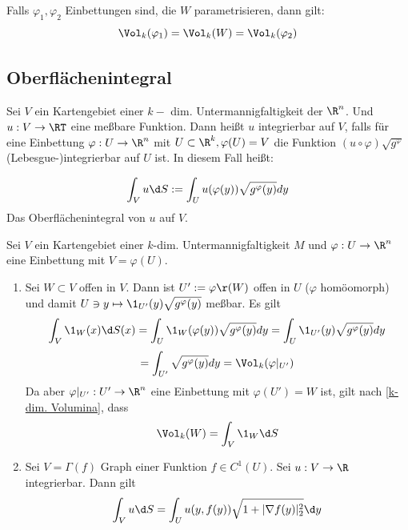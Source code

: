 \documentclass[11pt, a4paper]{article}
\begin{document}
\begin{note} Falls $\varphi_1, \varphi_2$ Einbettungen sind, die $W$ parametrisieren, dann gilt:
$$\Vol_k(\varphi_1) = \Vol_k(W) = \Vol_k(\varphi_2)$$
\end{note}

\vspace{0.3cm} \par \subsection{Oberflächenintegral}
\begin{definition} Sei $V$ ein Kartengebiet einer $k-$ dim. Untermannigfaltigkeit der $\R^n$. Und $u:V\to \RT$ eine meßbare Funktion. Dann heißt $u$ integrierbar auf $V$, falls für eine Einbettung $\varphi: U \to \R^n$ mit $U\subset \R^k , \varphi(U) = V$ die Funktion $(u\circ \varphi)\sqrt{g^\varphi}$ (Lebesgue-)integrierbar auf $U$ ist. In diesem Fall heißt:

$$\int_V u \d S := \int_U u(\varphi(y))\sqrt{g^\varphi(y)} dy$$
Das Oberflächenintegral von $u$ auf $V$.
\end{definition}

\begin{example}
    Sei $V$ ein Kartengebiet einer $k$-dim. Untermannigfaltigkeit $M$ und $\varphi: U \to \R^n$ eine Einbettung mit $V= \varphi(U)$.

    \begin{enumerate}
        \item Sei $W\subset V$ offen in $V$. Dann ist $U':=\varphi\r (W)$ offen in $U$ ($\varphi$ homöomorph) und damit $U\ni y\mapsto \1 _{U'}(y)\sqrt{g^\varphi (y)}$ meßbar. Es gilt
        $$\int _V \1 _{W}(x)\d S(x) = \int _U \1 _{W}(\varphi(y))\sqrt{g^\varphi (y)} dy= \int _U \1 _{U'}(y)\sqrt{g^\varphi (y)} dy $$
        $$= \int _{U'} \sqrt{g^\varphi (y)} dy= \Vol_k(\varphi|_{U'})$$
        Da aber $\varphi|_{U'}: U' \to \R^n$ eine Einbettung mit $\varphi(U')= W$ ist, gilt nach \ref{k-dim. Volumina}, dass
        $$\Vol_k(W) = \int_V \1_W \d S$$
        \item Sei $V = \Gamma(f)$ Graph einer Funktion $f \in C^1(U)$. Sei $u : V \to \R $ integrierbar. Dann gilt
$$ \int _V u \d S = \int _U u(y,f(y)) \sqrt{1+ |\nabla f(y)|^2 _2 }\d y$$
    \end{enumerate}
    
\end{example}
\end{document}
